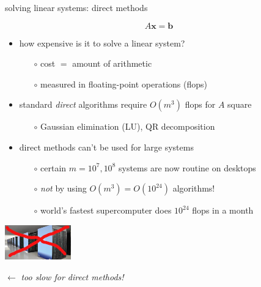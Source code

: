 \documentclass[usepdftitle=false,usenames,dvipsnames]{beamer}
\newcommand{\bb}{\mathbf{b}}
\newcommand{\bx}{\mathbf{x}}
\begin{document}
\begin{frame}{solving linear systems: direct methods}

$$A \bx = \bb$$

\begin{itemize}
\item how expensive is it to solve a linear system?
    \begin{itemize}
    \item[$\circ$] cost $=$ amount of arithmetic
    \item[$\circ$] measured in floating-point operations (flops)
    \end{itemize}
\item standard \emph{direct} algorithms require $O(m^3)$ flops for $A$ square
    \begin{itemize}
    \item[$\circ$] Gaussian elimination (LU), QR decomposition
    \end{itemize}
\item direct methods can't be used for large systems
    \begin{itemize}
    \item[$\circ$] certain $m=10^7,10^8$ systems are now routine on desktops
    \item[$\circ$] \emph{not} by using $O(m^3)=O(10^{24})$ algorithms!
    \item[$\circ$] world's fastest supercomputer does $10^{24}$ flops in a month
    \end{itemize}
\end{itemize}

\bigskip
\hspace{20mm} \includegraphics[height=15mm]{figs/fugaku-too-slow}

\vspace{-10mm} \hfill $\gets$ \emph{too slow for direct methods!}
\end{frame}
\end{document}
